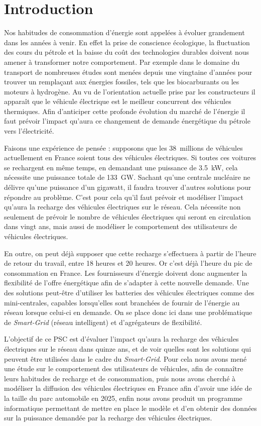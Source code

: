 \section*{Introduction}

Nos habitudes de consommation d'énergie sont appelées à évoluer grandement dans les années à venir.
En effet la prise de conscience écologique, la fluctuation des cours du pétrole et la baisse du coût des technologies durables doivent nous amener à transformer notre comportement. 
Par exemple dans le domaine du transport de nombreuses études sont menées depuis une vingtaine d'années pour trouver un remplaçant aux énergies fossiles, tels que les biocarburants ou les moteurs à hydrogène.
Au vu de l'orientation actuelle prise par les constructeurs il apparaît que le véhicule électrique est le meilleur concurrent des véhicules thermiques. 
Afin d'anticiper cette profonde évolution du marché de l'énergie il faut prévoir l'impact qu'aura ce changement de demande énergétique du pétrole vers l'électricité. 

Faisons une expérience de pensée : supposons que les 38~millions de véhicules actuellement en France soient tous des véhicules électriques. Si toutes ces voitures se rechargent en même temps, en demandant une puissance de \SI{3.5}{\kilo\watt}, cela nécessite une puissance totale de \SI{133}{\giga\watt}. Sachant qu'une centrale nucléaire ne délivre qu'une puissance d'un gigawatt, il faudra trouver d'autres solutions pour répondre au problème. C'est pour cela qu'il faut prévoir et modéliser l'impact qu'aura la recharge des véhicules électriques sur le réseau. Cela nécessite non seulement de prévoir le nombre de véhicules électriques qui seront en circulation dans vingt ans, mais aussi de modéliser le comportement des utilisateurs de véhicules électriques. 

En outre, on peut déjà supposer que cette recharge s'effectuera à partir de l'heure de retour du travail, entre 18 heures et 20 heures. Or c'est déjà l'heure du pic de consommation en France. Les fournisseurs d'énergie doivent donc augmenter la flexibilité de l'offre énergétique afin de s'adapter à cette nouvelle demande. Une des solutions peut-être d'utiliser les batteries des véhicules électriques comme des \og{}mini-centrales\fg{}, capables lorsqu'elles sont branchées de fournir de l'énergie au réseau lorsque celui-ci en demande. On se place donc ici dans une problématique de \emph{Smart-Grid} (réseau intelligent) et d'agrégateurs de flexibilité. 

L'objectif de ce PSC est d'évaluer l'impact qu'aura la recharge des véhicules électriques sur le réseau dans quinze ans, et de voir quelles sont les solutions qui peuvent être utilisées dans le cadre du \emph{Smart-Grid}. Pour cela nous avons mené une étude sur le comportement des utilisateurs de véhicules, afin de connaître leurs habitudes de recharge et de consommation, puis nous avons cherché à modéliser la diffusion des véhicules électriques en France afin d'avoir une idée de la taille du parc automobile en 2025, enfin nous avons produit un programme informatique permettant de mettre en place le modèle et d'en obtenir des données sur la puissance demandée par la recharge des véhicules électriques.
